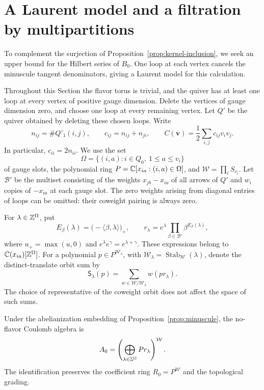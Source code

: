 \section{A Laurent model and a filtration by multipartitions}
\label{sec:laurent}

To complement the surjection of Proposition~\ref{prop:kernel-inclusion},
we seek an upper bound for the Hilbert series of $B_0$.  One loop at each
vertex cancels the minuscule tangent denominators, giving a Laurent model
for this calculation.

Throughout this Section the flavor torus is trivial, and the quiver has at
least one loop at every vertex of positive gauge dimension.  Delete the
vertices of gauge dimension zero, and choose one loop at every remaining
vertex.  Let $Q'$ be the quiver obtained by deleting these chosen loops.
Write
\[
 n_{ij}=\#Q'_1(i,j),\qquad c_{ij}=n_{ij}+n_{ji},\qquad
 C(\mathbf v)=\frac12\sum_{i,j}c_{ij}v_iv_j.
\]
In particular, $c_{ii}=2n_{ii}$.  We use the set
\[
 \Omega=\{(i,a):i\in Q_0,\ 1\leq a\leq v_i\}
\]
of gauge slots, the polynomial ring $P=\mathbb C[x_{ia}:(i,a)\in\Omega]$, and
$\mathcal W=\prod_iS_{v_i}$.  Let $\mathcal B'$ be the multiset consisting
of the weights $x_{jb}-x_{ia}$ of all arrows of $Q'$ and $w_i$ copies of
$-x_{ia}$ at each gauge slot.  The zero weights arising from diagonal
entries of loops can be omitted: their coweight pairing is always zero.

For $\lambda\in\mathbb Z^\Omega$, put
\[
 E_\beta(\lambda)=\bigl(-\langle\beta,\lambda\rangle\bigr)_+,
 \qquad
 r_\lambda=e^\lambda\prod_{\beta\in\mathcal B'}
                      \beta^{E_\beta(\lambda)},
\]
where $u_+=\max(u,0)$ and $e^\lambda e^\gamma=e^{\lambda+\gamma}$.
These expressions belong to $\mathbb C(x_{ia})[\mathbb Z^\Omega]$.  For a polynomial
$p\in P^{\mathcal W_\lambda}$, with
$\mathcal W_\lambda=\operatorname{Stab}_{\mathcal W}(\lambda)$, denote
the distinct-translate orbit sum by
\[
 \mathsf S_\lambda(p)=
 \sum_{w\in\mathcal W/\mathcal W_\lambda}w(p r_\lambda).
\]
The choice of representative of the coweight orbit does not affect the
space of such sums.

\begin{proposition}\label{prop:laurent-model}
Under the abelianization embedding of
Proposition~\ref{prop:minuscule}, the no-flavor Coulomb algebra is
\begin{equation}\label{eq:laurent-model}
 A_0=\left(\bigoplus_{\lambda\in\mathbb Z^\Omega}P r_\lambda\right)^{\mathcal W}.
\end{equation}
The identification preserves the coefficient ring $R_0=P^{\mathcal W}$
and the topological grading.
\end{proposition}

